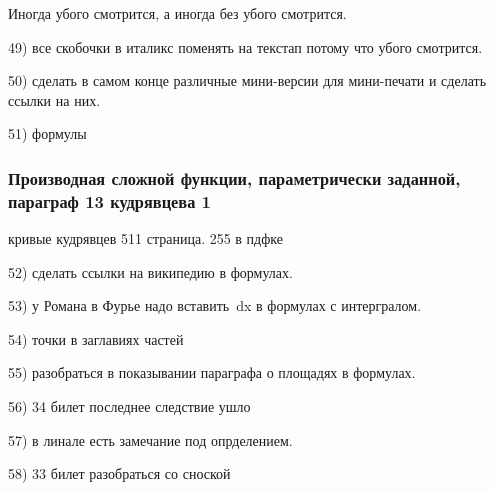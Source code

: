 Иногда убого смотрится, а иногда без \noindent убого смотрится.

49) все скобочки в италикс поменять на текстап потому что убого смотрится.

50) сделать в самом конце различные мини-версии для мини-печати и сделать ссылки на них.

51) формулы
\subsubsection{Производная сложной функции, параметрически заданной, параграф 13 кудрявцева 1}

кривые кудрявцев 511 страница. 255 в пдфке


52) сделать ссылки на википедию в формулах.

53) у Романа в Фурье надо вставить \,dx в формулах с интергралом.

54) точки в заглавиях частей

55) разобраться в показывании параграфа о площадях в формулах.

56) 34 билет последнее следствие ушло

57) в линале есть замечание под опрделением.

58) 33 билет разобраться со сноской